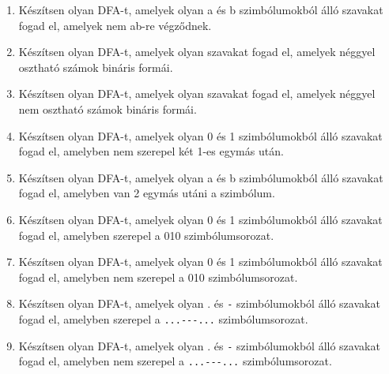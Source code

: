 \documentclass[a4paper]{article}
\begin{document}
\begin{enumerate}
\item Készítsen olyan DFA-t, amelyek olyan a és b szimbólumokból álló szavakat
fogad el, amelyek nem ab-re végződnek.

\item Készítsen olyan DFA-t, amelyek olyan szavakat fogad el, amelyek néggyel
osztható számok bináris formái.

\item Készítsen olyan DFA-t, amelyek olyan szavakat fogad el, amelyek néggyel
nem osztható számok bináris formái.

\item Készítsen olyan DFA-t, amelyek olyan 0 és 1 szimbólumokból álló szavakat
fogad el, amelyben nem szerepel két 1-es egymás után.

\item Készítsen olyan DFA-t, amelyek olyan a és b szimbólumokból álló szavakat
fogad el, amelyben van 2 egymás utáni a szimbólum.

\item Készítsen olyan DFA-t, amelyek olyan 0 és 1 szimbólumokból álló szavakat
fogad el, amelyben szerepel a 010 szimbólumsorozat.

\item Készítsen olyan DFA-t, amelyek olyan 0 és 1 szimbólumokból álló szavakat
fogad el, amelyben nem szerepel a 010 szimbólumsorozat.

\item Készítsen olyan DFA-t, amelyek olyan . és \verb|-| szimbólumokból álló szavakat
fogad el, amelyben szerepel a \verb|...---...| szimbólumsorozat.

\item Készítsen olyan DFA-t, amelyek olyan . és \verb|-| szimbólumokból álló szavakat
fogad el, amelyben nem szerepel a \verb|...---...| szimbólumsorozat.
\end{enumerate}
\end{document}
